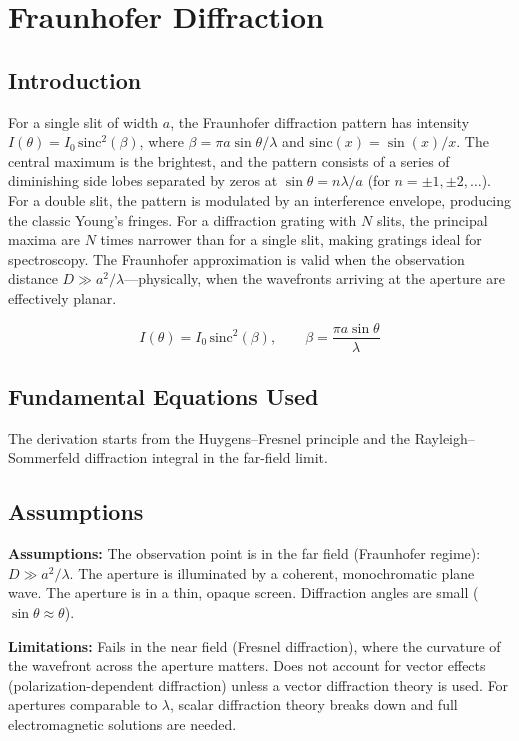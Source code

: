 \chapter{Fraunhofer Diffraction}

\section*{Introduction}

For a single slit of width $a$, the Fraunhofer diffraction pattern has intensity $I(\theta) = I_0\,\text{sinc}^2(\beta)$, where $\beta = \pi a \sin\theta/\lambda$ and $\text{sinc}(x) = \sin(x)/x$. The central maximum is the brightest, and the pattern consists of a series of diminishing side lobes separated by zeros at $\sin\theta = n\lambda/a$ (for $n = \pm 1, \pm 2, \ldots$). For a double slit, the pattern is modulated by an interference envelope, producing the classic Young's fringes. For a diffraction grating with $N$ slits, the principal maxima are $N$ times narrower than for a single slit, making gratings ideal for spectroscopy. The Fraunhofer approximation is valid when the observation distance $D \gg a^2/\lambda$---physically, when the wavefronts arriving at the aperture are effectively planar.


\[
I(\theta) = I_0\,\text{sinc}^2(\beta),\qquad \beta = \frac{\pi a \sin\theta}{\lambda}
\]

\section*{Fundamental Equations Used}

The derivation starts from the Huygens--Fresnel principle and the Rayleigh--Sommerfeld diffraction integral in the far-field limit.

\section*{Assumptions}

\textbf{Assumptions:} The observation point is in the far field (Fraunhofer regime): $D \gg a^2/\lambda$. The aperture is illuminated by a coherent, monochromatic plane wave. The aperture is in a thin, opaque screen. Diffraction angles are small ($\sin\theta \approx \theta$).


\textbf{Limitations:} Fails in the near field (Fresnel diffraction), where the curvature of the wavefront across the aperture matters. Does not account for vector effects (polarization-dependent diffraction) unless a vector diffraction theory is used. For apertures comparable to $\lambda$, scalar diffraction theory breaks down and full electromagnetic solutions are needed.


